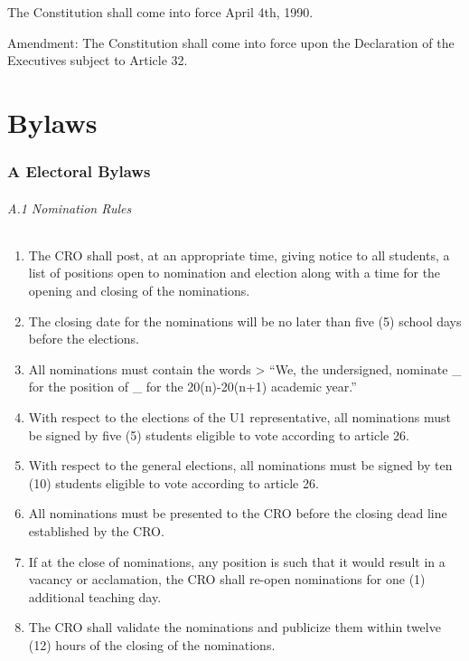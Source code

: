 The Constitution shall come into force April 4th, 1990.

Amendment: The Constitution shall come into force upon the Declaration
of the Executives subject to Article 32.

\part{Bylaws}\label{bylaws}

\section{A Electoral Bylaws}\label{a-electoral-bylaws}

\paragraph{A.1 Nomination Rules}\label{a.1-nomination-rules}

\begin{enumerate}
\def\labelenumi{\arabic{enumi}.}
\item
  The CRO shall post, at an appropriate time, giving notice to all
  students, a list of positions open to nomination and election along
  with a time for the opening and closing of the nominations.
\item
  The closing date for the nominations will be no later than five (5)
  school days before the elections.
\item
  All nominations must contain the words \textgreater{} ``We, the
  undersigned, nominate \_ for the position of \_ for the 20(n)-20(n+1)
  academic year.''
\item
  With respect to the elections of the U1 representative, all
  nominations must be signed by five (5) students eligible to vote
  according to article 26.
\item
  With respect to the general elections, all nominations must be signed
  by ten (10) students eligible to vote according to article 26.
\item
  All nominations must be presented to the CRO before the closing dead
  line established by the CRO.
\item
  If at the close of nominations, any position is such that it would
  result in a vacancy or acclamation, the CRO shall re-open nominations
  for one (1) additional teaching day.
\item
  The CRO shall validate the nominations and publicize them within
  twelve (12) hours of the closing of the nominations.
\end{enumerate}

